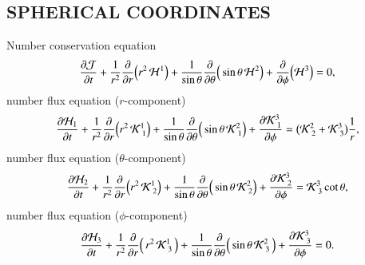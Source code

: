 \documentclass[11pt,letterpaper,twoside,english,final]{article}
\begin{document}
\subsection{SPHERICAL COORDINATES}

Number conservation equation
\begin{equation}
  \frac{\partial \mathcal{J}}{\partial t}
  +\frac{1}{r^{2}}\frac{\partial }{\partial r}\Big(r^{2}\,\mathcal{H}^{1}\Big)
  +\frac{1}{\sin\theta}\frac{\partial }{\partial \theta}\Big(\sin\theta\,\mathcal{H}^{2}\Big)
  +\frac{\partial }{\partial \phi}\Big(\mathcal{H}^{3}\Big)=0,
\end{equation}
number flux equation ($r$-component)
\begin{equation}
  \frac{\partial \mathcal{H}_{1}}{\partial t}
  +\frac{1}{r^{2}}\frac{\partial }{\partial r}\Big(r^{2}\,\mathcal{K}^{1}_{~1}\Big)
  +\frac{1}{\sin\theta}\frac{\partial }{\partial \theta}\Big(\sin\theta\,\mathcal{K}^{2}_{~1}\Big)
  +\frac{\partial \mathcal{K}^{3}_{~1}}{\partial \phi}
  =\big(\mathcal{K}^{2}_{~2}+\mathcal{K}^{3}_{~3}\big)\frac{1}{r},
\end{equation}
number flux equation ($\theta$-component)
\begin{equation}
  \frac{\partial \mathcal{H}_{2}}{\partial t}
  +\frac{1}{r^{2}}\frac{\partial }{\partial r}\Big(r^{2}\,\mathcal{K}^{1}_{~2}\Big)
  +\frac{1}{\sin\theta}\frac{\partial }{\partial \theta}\Big(\sin\theta\,\mathcal{K}^{2}_{~2}\Big)
  +\frac{\partial \mathcal{K}^{3}_{~2}}{\partial \phi}
  =\mathcal{K}^{3}_{~3}\cot\theta,
\end{equation}
number flux equation ($\phi$-component)
\begin{equation}
  \frac{\partial \mathcal{H}_{3}}{\partial t}
  +\frac{1}{r^{2}}\frac{\partial }{\partial r}\Big(\,r^{2}\,\mathcal{K}^{1}_{~3}\,\Big)
  +\frac{1}{\sin\theta}\frac{\partial }{\partial \theta}\Big(\sin\theta\,\mathcal{K}^{2}_{~3}\,\Big)
  +\frac{\partial \mathcal{K}^{3}_{~3}}{\partial \phi}=0.
\end{equation}
\end{document}
